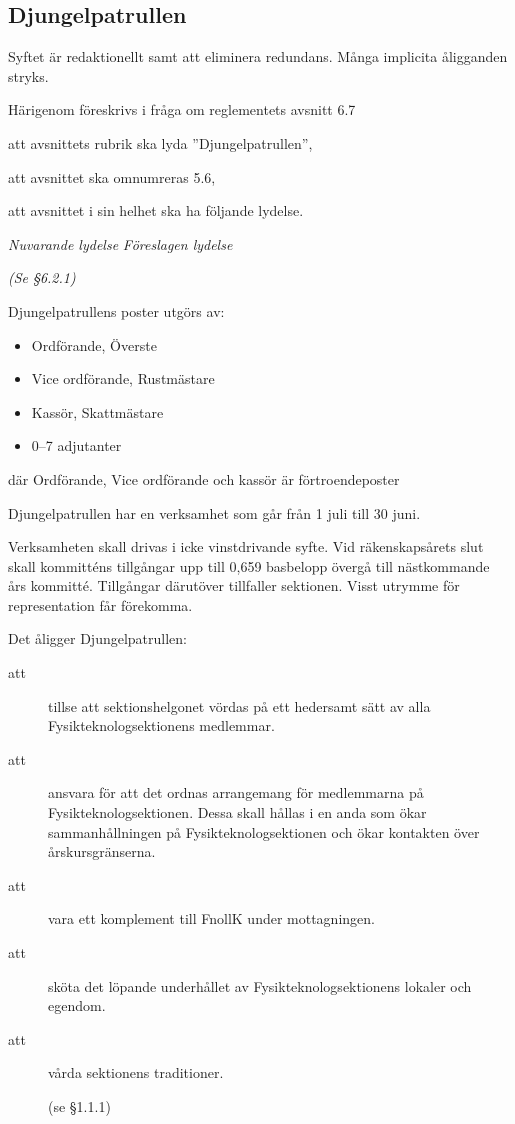 \documentclass{article}
\newenvironment{lydelse}
    {\begin{paracol}{2}%
        \emph{Nuvarande lydelse}%
        \switchcolumn%
        \emph{Föreslagen lydelse}%
    \end{paracol}%
    \begin{enumerate}[label=\thesubsection.\arabic*]%
    \begin{paracol}{2}%
    }{\end{paracol}\end{enumerate}}
\begin{document}
\subsection{Djungelpatrullen}
Syftet är redaktionellt samt att eliminera redundans.
Många implicita åligganden stryks.

Härigenom föreskrivs i fråga om reglementets avsnitt 6.7

\begin{dels}
    \item att avsnittets rubrik ska lyda ''Djungelpatrullen'',
    \item att avsnittet ska omnumreras 5.6,
    \item att avsnittet i sin helhet ska ha följande lydelse.
\end{dels}

\begin{lydelse}
    \item[] \emph{(Se \S6.2.1)}
    
    \setcounter{section}{6}
    \setcounter{subsection}{7}
    
    \vspace{1.2em}
    \item Djungelpatrullens poster utgörs av:
	\begin{itemize}
		\item Ordförande, Överste
		\item Vice ordförande, Rustmästare
		\item Kassör, Skattmästare
		\item 0--7 adjutanter
	\end{itemize}
    där Ordförande, Vice ordförande och kassör är förtroendeposter

    \item Djungelpatrullen har en verksamhet som går från 1 juli till 30 juni.

    \item Verksamheten skall drivas i icke vinstdrivande syfte. Vid räkenskapsårets slut skall kommitténs tillgångar upp till 0,659 basbelopp övergå till nästkommande års kommitté. Tillgångar därutöver tillfaller sektionen. Visst utrymme för representation får förekomma.

    \item Det åligger Djungelpatrullen:
	\begin{description}
		\item[att] tillse att sektionshelgonet vördas på ett hedersamt sätt av alla Fysikteknologsektionens medlemmar.   
		\item[att] ansvara för att det ordnas arrangemang för medlemmarna på Fysikteknologsektionen. Dessa skall hållas i en anda som ökar sammanhållningen på Fysikteknologsektionen och ökar kontakten över årskursgränserna.
		\item[att] vara ett komplement till FnollK under mottagningen. 
		\item[att] sköta det löpande underhållet av Fysikteknologsektionens lokaler och egendom.
		\item[att] vårda sektionens traditioner.
		\item[] (se §1.1.1) 
	\end{description}
	

\end{lydelse}
\end{document}
